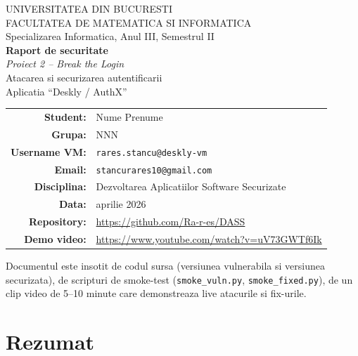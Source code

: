 \documentclass[12pt,a4paper]{article}
\begin{document}
\begin{titlepage}
\begin{center}
\vspace*{1.5cm}

{\large UNIVERSITATEA DIN BUCURESTI}\\[0.2cm]
{\large FACULTATEA DE MATEMATICA SI INFORMATICA}\\[0.2cm]
{\large Specializarea Informatica, Anul III, Semestrul II}\\[2.5cm]

{\Huge\bfseries Raport de securitate}\\[0.6cm]
{\LARGE\itshape Proiect 2 -- Break the Login}\\[0.4cm]
{\Large Atacarea si securizarea autentificarii}\\[0.6cm]
{\large Aplicatia ``Deskly / AuthX''}\\[3cm]

\begin{tabular}{rl}
\textbf{Student:}     & Nume Prenume \\
\textbf{Grupa:}       & NNN \\
\textbf{Username VM:} & \texttt{rares.stancu@deskly-vm} \\
\textbf{Email:}       & \texttt{stancurares10@gmail.com} \\
\textbf{Disciplina:}  & Dezvoltarea Aplicatiilor Software Securizate \\
\textbf{Data:}        & aprilie 2026 \\
\textbf{Repository:}  & \url{https://github.com/Ra-r-es/DASS} \\
\textbf{Demo video:}  & \url{https://www.youtube.com/watch?v=uV73GWTf6Ik} \\
\end{tabular}

\vfill
{\small Documentul este insotit de codul sursa (versiunea vulnerabila si versiunea securizata),
de scripturi de smoke-test (\texttt{smoke\_vuln.py}, \texttt{smoke\_fixed.py}),
de un clip video de 5--10 minute care
demonstreaza live atacurile si fix-urile.}
\end{center}
\end{titlepage}

\tableofcontents
\listoffigures
\listoftables
\newpage

\section*{Rezumat}
\end{document}

